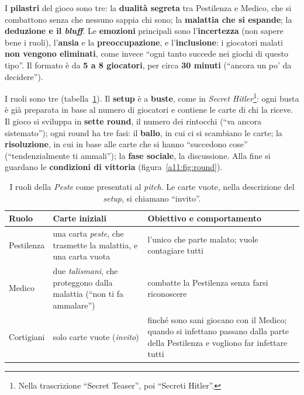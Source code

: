 I \textbf{pilastri} del gioco sono tre: la \textbf{dualità segreta} tra Pestilenza e
Medico, che si combattono senza che nessuno sappia chi sono; la \textbf{malattia che si
espande}; la \textbf{deduzione e il \emph{bluff}}. Le \textbf{emozioni} principali sono
l'\textbf{incertezza} (non sapere bene i ruoli), l'\textbf{ansia} e la
\textbf{preoccupazione}, e l'\textbf{inclusione}: i giocatori malati \textbf{non vengono
eliminati}, come invece ``ogni tanto succede nei giochi di questo tipo''. Il formato è da
\textbf{5 a 8 giocatori}, per circa \textbf{30 minuti} (``ancora un po' da decidere'').

I ruoli sono tre (tabella~\ref{a11:tab:ruoli}). Il \textbf{setup} è a \textbf{buste},
come in \emph{Secret Hitler}\footnote{Nella trascrizione ``Secret Teaser'', poi
``Secreti Hitler''.}: ogni busta è già preparata in base al numero di giocatori e
contiene le carte di chi la riceve. Il gioco si sviluppa in \textbf{sette round}, il
numero dei rintocchi (``va ancora sistemato''); ogni round ha tre fasi: il
\textbf{ballo}, in cui ci si scambiano le carte; la \textbf{risoluzione}, in cui in base
alle carte che si hanno ``succedono cose'' (``tendenzialmente ti ammali''); la
\textbf{fase sociale}, la discussione. Alla fine si guardano le \textbf{condizioni di
vittoria} (figura~\ref{a11:fig:round}).

\begin{table}[htbp]
\centering
\small
\begin{tabular}{@{}p{2.4cm}p{4.6cm}p{6cm}@{}}
\toprule
\textbf{Ruolo} & \textbf{Carte iniziali} & \textbf{Obiettivo e comportamento} \\
\midrule
Pestilenza & una carta \emph{peste}, che trasmette la malattia, e una carta vuota &
l'unico che parte malato; vuole contagiare tutti \\
Medico & due \emph{talismani}, che proteggono dalla malattia (``non ti fa ammalare'') &
combatte la Pestilenza senza farsi riconoscere \\
Cortigiani & solo carte vuote (\emph{invito}) & finché sono sani giocano con il Medico;
quando si infettano passano dalla parte della Pestilenza e vogliono far infettare
tutti \\
\bottomrule
\end{tabular}
\caption{I ruoli della \emph{Peste} come presentati al \emph{pitch}. Le carte vuote,
nella descrizione del \emph{setup}, si chiamano ``invito''.}
\label{a11:tab:ruoli}
\end{table}

